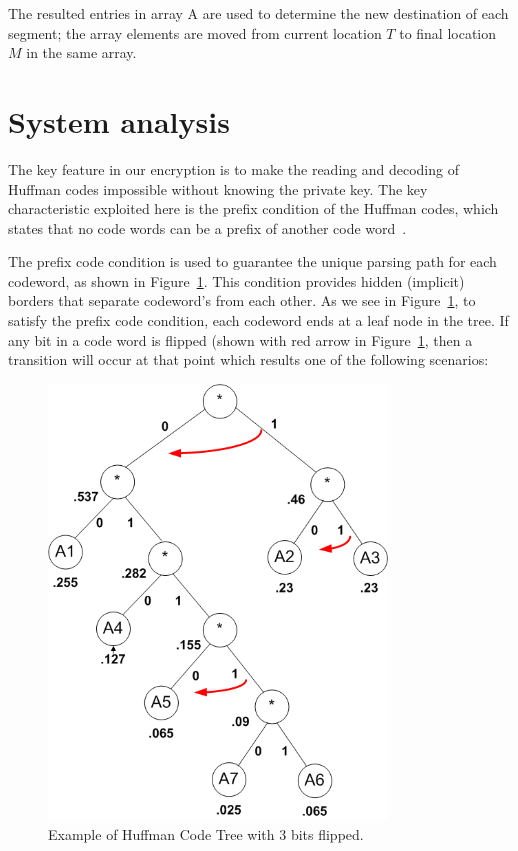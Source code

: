 \documentclass[preprint]{elsarticle}
\begin{document}
The resulted entries in array A are used to determine the new destination of each segment; the array elements are moved from current location $T$ to final location $M$ in the same array.


\section{System analysis}
\label{SystemAnalisis}

The key feature in our encryption is to make the reading and decoding of Huffman codes impossible without knowing the private key. The key characteristic exploited here is the prefix condition of the Huffman codes, which states that no code words can be a prefix of another code word~\cite{Huffman1952}.

The prefix code condition is used to guarantee the unique parsing path for each codeword, as shown in Figure~\ref{f5}. This condition provides hidden (implicit) borders that separate codeword's from each other. As we see in Figure~\ref{f5}, to satisfy the prefix code condition, each codeword ends at a leaf node in the tree. If any bit in a code word is flipped (shown with red arrow in Figure~\ref{f5}, then a transition will occur at that point which results one of the following scenarios:


\begin{figure}[!ht]
\centering
\includegraphics[width=9cm]{figure5.png}
\caption{Example of Huffman Code Tree with 3 bits flipped.}
\label{f5}
\end{figure} 
\end{document}

